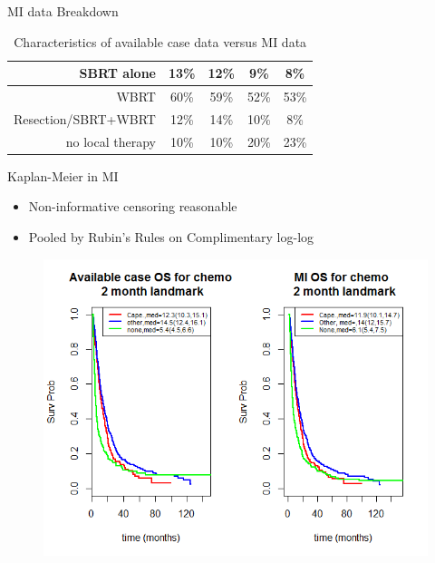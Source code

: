 \begin{frame}{MI data Breakdown}
\begin{table}[!ht]
{\begin{tabular}{|r|c|c|c|c|}
SBRT alone                                        & 13\%                                                                  & 12\%                                                      & 9\%                                                                      & 8\%                                                          \\ \hline
WBRT                                              & 60\%                                                                  & 59\%                                                      & 52\%                                                                     & 53\%                                                         \\ \hline
Resection/SBRT+WBRT                               & 12\%                                                                  & 14\%                                                      & 10\%                                                                     & 8\%                                                          \\ \hline
no local therapy                                  & 10\%                                                                  & 10\%                                                      & 20\%                                                                     & 23\%                                                         \\ \hline
\end{tabular}
}
\caption{Characteristics of available case data versus MI data}
\label{table:chartab}
\end{table}
 
\end{frame}

\begin{frame}{Kaplan-Meier in MI}
 \begin{itemize}
  \item Non-informative censoring reasonable
  \item Pooled by Rubin's Rules on Complimentary log-log
 \end{itemize}
 \begin{figure}[h!]
  \centering
\includegraphics[width=.8\textwidth]{cape_km}
\end{figure}
\end{frame}

